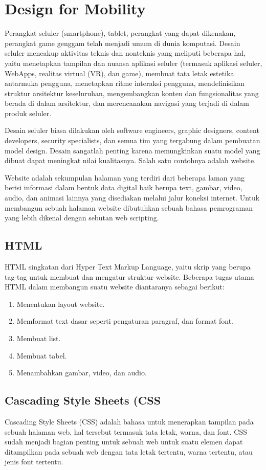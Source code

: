 \section{Design for Mobility}
\label{sec:designMobility}
Perangkat seluler (smartphone), tablet, perangkat yang dapat dikenakan, perangkat game genggam telah menjadi umum di dunia komputasi. Desain seluler mencakup aktivitas teknis dan nonteknis yang meliputi beberapa hal, yaitu menetapkan tampilan dan nuansa aplikasi seluler (termasuk aplikasi seluler, WebApps, realitas virtual (VR), dan game), membuat tata letak estetika antarmuka pengguna, menetapkan ritme interaksi pengguna, mendefinisikan struktur arsitektur keseluruhan, mengembangkan konten dan fungsionalitas yang berada di dalam arsitektur, dan merencanakan navigasi yang terjadi di dalam produk seluler. 

Desain seluler biasa dilakukan oleh software engineers, graphic designers, content developers, security specialists, dan semua tim yang tergabung dalam pembuatan model design. Desain sangatlah penting karena memungkinkan suatu model yang dibuat dapat meningkat nilai kualitasnya. Salah satu contohnya adalah website. 

Website adalah sekumpulan halaman yang terdiri dari beberapa laman yang berisi informasi dalam bentuk data digital baik berupa text, gambar, video, audio, dan animasi lainnya yang disediakan melalui jalur koneksi internet. Untuk membangun sebuah halaman website dibutuhkan sebuah bahasa pemrograman yang lebih dikenal dengan sebutan web scripting. 

\subsection{HTML}
HTML singkatan dari Hyper Text Markup Language, yaitu skrip yang berupa tag-tag untuk membuat dan mengatur struktur website. Beberapa tugas utama HTML dalam membangun suatu website diantaranya sebagai berikut:
\begin{enumerate}
	\item Menentukan layout website.
	\item Memformat text dasar seperti pengaturan paragraf, dan format font.
	\item Membuat list.
	\item Membuat tabel.
	\item Menambahkan gambar, video, dan audio.
\end{enumerate}

\subsection{Cascading Style Sheets (CSS}
Cascading Style Sheets (CSS) adalah bahasa untuk menerapkan tampilan pada sebuah halaman
web, hal tersebut termasuk tata letak, warna, dan font. CSS sudah menjadi bagian penting untuk sebuah web untuk suatu elemen dapat ditampilkan pada sebuah web dengan tata letak tertentu, warna tertentu, atau jenis font tertentu.

